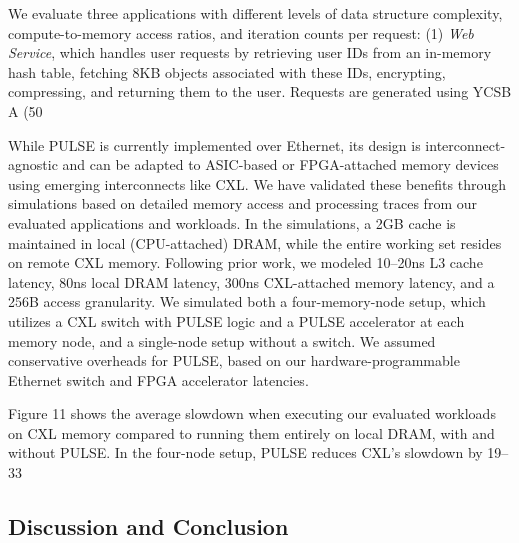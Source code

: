  We evaluate three applications with different levels of data structure complexity, compute-to-memory access ratios, and iteration counts per request: (1) \textit{Web Service}, which handles user requests by retrieving user IDs from an in-memory hash table, fetching 8KB objects associated with these IDs, encrypting, compressing, and returning them to the user. Requests are generated using YCSB A (50%



While PULSE is currently implemented over Ethernet, its design is interconnect-agnostic and can be adapted to ASIC-based or FPGA-attached memory devices using emerging interconnects like CXL. We have validated these benefits through simulations based on detailed memory access and processing traces from our evaluated applications and workloads. In the simulations, a 2GB cache is maintained in local (CPU-attached) DRAM, while the entire working set resides on remote CXL memory. Following prior work, we modeled 10–20ns L3 cache latency, 80ns local DRAM latency, 300ns CXL-attached memory latency, and a 256B access granularity. We simulated both a four-memory-node setup, which utilizes a CXL switch with PULSE logic and a PULSE accelerator at each memory node, and a single-node setup without a switch. We assumed conservative overheads for PULSE, based on our hardware-programmable Ethernet switch and FPGA accelerator latencies.

Figure 11 shows the average slowdown when executing our evaluated workloads on CXL memory compared to running them entirely on local DRAM, with and without PULSE. In the four-node setup, PULSE reduces CXL’s slowdown by 19–33%




\subsection{Discussion and Conclusion}
